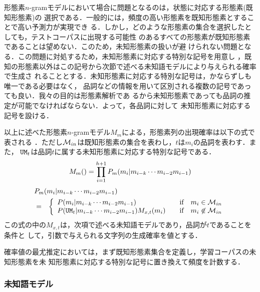 形態素$n$-gramモデルにおいて場合に問題となるのは，状態に対応する形態素(既知形態素)の
選択である．一般的には，頻度の高い形態素を既知形態素とすることで高い予測力が実現でき
る．しかし，どのような形態素の集合を選択したとしても，テストコーパスに出現する可能性
のあるすべての形態素が既知形態素であることは望めない．このため，未知形態素の扱いが避
けられない問題となる．この問題に対処するため，未知形態素に対応する特別な記号を用意し
，既知の形態素以外はこの記号から次節で述べる未知語モデルにより与えられる確率で生成さ
れることとする．未知形態素に対応する特別な記号は，かならずしも唯一である必要はなく，
品詞などの情報を用いて区別される複数の記号であっても良い．我々の目的は形態素解析であ
るから未知形態素であっても品詞の推定が可能でなければならない．よって，各品詞に対して
未知形態素に対応する記号を設ける．

以上に述べた形態素$n$-gramモデル$M_{m}$による，形態素列の出現確率は以下の式で表される
．ただし${\cal M}_{in}$は既知形態素の集合を表わし，$t$は$m_{i}$の品詞を表わす．また，
${\tt UM}_{t}$は品詞$t$に属する未知形態素に対応する特別な記号である．
\begin{equation}
  \label{equation:morph_n-gram1}
  M_{m}(\Conc{m}{h}) = \prod_{i=1}^{h+1} P_{m}(m_{i}|m_{i-k} \cdots m_{i-2}m_{i-1})
\end{equation}
\begin{eqnarray}
  \label{equation:morph_n-gram2}
  \lefteqn{P_{m}(m_{i}|m_{i-k} \cdots m_{i-2}m_{i-1})} \nonumber \\
  & = & \left\{\begin{array}{lccl}
          P(m_{i}|m_{i-k} \cdots m_{i-2}m_{i-1})
            & & \mbox{if} & m_{i} \in {\cal M}_{in} \\
          P({\tt UM}_{t}|m_{i-k} \cdots m_{i-2}m_{i-1})M_{x,t}(m_{i})
            & & \mbox{if} & m_{i} \not \in {\cal M}_{in} \\
        \end{array}\right.
\end{eqnarray}
この式の中の$M_{x,t}$は，次項で述べる未知語モデルであり，品詞が$t$であることを条件と
して，引数で与えられる文字列の生成確率を値とする．

確率値の最尤推定においては，まず既知形態素集合を定義し，学習コーパスの未知形態素を未
知形態素に対応する特別な記号に置き換えて頻度を計数する．


\subsubsection{未知語モデル} 

